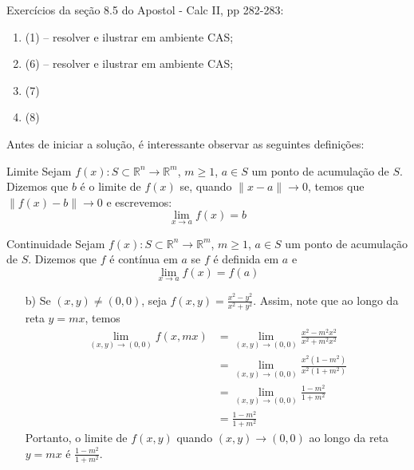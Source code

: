 \documentclass[../main.tex]{subfiles}
\begin{document}
		\begin{exercicio}{4}
			Exercícios da seção 8.5 do Apostol - Calc II, pp 282-283:
			\begin{enumerate}[label=\alph*)]
				\item (1) -- resolver e ilustrar em ambiente CAS;
				\item (6) -- resolver e ilustrar em ambiente CAS;
				\item (7)
				\item (8)
			\end{enumerate}
		\end{exercicio}
		\begin{solucao}
			Antes de iniciar a solução, é interessante observar as seguintes definições:
			\begin{definicao}{Limite}
				Sejam $f(x)\colon S\subset \mathbb{R}^n\to \mathbb{R}^m$, $m\geq 1$, $a\in S$ um ponto de acumulação de $S$. Dizemos que $b$ é o limite de $f(x)$ se, quando $\|x-a\|\to 0$, temos que $\|f(x)-b\|\to 0$ e escrevemos:
				\[
				\lim_{x\to a}f(x)=b
				\]
			\end{definicao}
			\begin{definicao}{Continuidade}
				Sejam $f(x)\colon S\subset \mathbb{R}^n\to \mathbb{R}^m$, $m\geq 1$, $a\in S$ um ponto de acumulação de $S$. Dizemos que $f$ é contínua em $a$ se $f$ é definida em $a$ e
				\[
				\lim_{x\to a}f(x)=f(a)
				\]
			\end{definicao}
			\begin{enumerate}[label=\alph*)]
				\item[b)] Se $(x,y)\neq (0,0)$, seja $f(x,y)=\tfrac{x^2-y^2}{x^2+y^2}$.
				Assim, note que ao longo da reta $y=mx$, temos
				\begin{align*}
					\lim_{(x,y)\to (0,0)} f(x,mx)
					&=\lim_{(x,y)\to (0,0)} \frac{x^2-m^2x^2}{x^2+m^2x^2}\\
					&=\lim_{(x,y)\to (0,0)}\frac{x^2(1-m^2)}{x^2(1+m^2)}\\
					&=\lim_{(x,y)\to (0,0)}\frac{1-m^2}{1+m^2}\\
					&=\frac{1-m^2}{1+m^2}
				\end{align*}
				Portanto, o limite de $f(x,y)$ quando $(x,y)\to (0,0)$ ao longo da reta $y=mx$ é $\tfrac{1-m^2}{1+m^2}$.
				

\end{enumerate}
\end{solucao}
\end{document}
